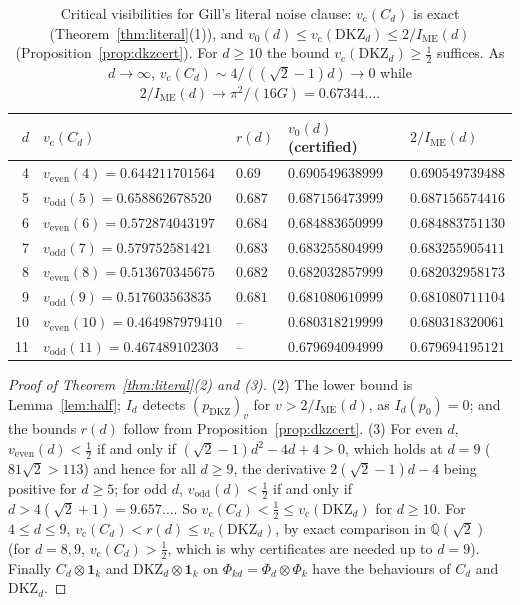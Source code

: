 \documentclass[11pt]{article}
\theoremstyle{remark}
\numberwithin{equation}{section}
\newcommand{\IME}{I_{\mathrm{ME}}}
\newcommand{\one}{\mathbf{1}}
\newcommand{\vc}{v_{\mathrm c}}
\newcommand{\veven}{v_{\mathrm{even}}}
\newcommand{\vodd}{v_{\mathrm{odd}}}
\newcommand{\DKZ}{\mathrm{DKZ}}
\begin{document}
\begin{table}[t]
\centering\small
\caption{Critical visibilities for Gill's literal noise clause: $\vc(C_d)$ is exact (Theorem~\ref{thm:literal}(1)), and
$v_0(d)\le\vc(\DKZ_d)\le2/\IME(d)$ (Proposition~\ref{prop:dkzcert}). For $d\ge10$ the bound $\vc(\DKZ_d)\ge\frac12$
suffices. As $d\to\infty$, $\vc(C_d)\sim4/((\sqrt2-1)d)\to0$ while $2/\IME(d)\to\pi^2/(16G)=0.67344\ldots$.}
\label{tab:thresholds}
\begin{tabular}{@{}rllll@{}}
\toprule
$d$ & $\vc(C_d)$ & $r(d)$ & $v_0(d)$ (certified) & $2/\IME(d)$\\
\midrule
4 & $\veven(4)=0.644211701564$ & $0.69$ & $0.690549638999$ & $0.690549739488$\\
5 & $\vodd(5)=0.658862678520$ & $0.687$ & $0.687156473999$ & $0.687156574416$\\
6 & $\veven(6)=0.572874043197$ & $0.684$ & $0.684883650999$ & $0.684883751130$\\
7 & $\vodd(7)=0.579752581421$ & $0.683$ & $0.683255804999$ & $0.683255905411$\\
8 & $\veven(8)=0.513670345675$ & $0.682$ & $0.682032857999$ & $0.682032958173$\\
9 & $\vodd(9)=0.517603563835$ & $0.681$ & $0.681080610999$ & $0.681080711104$\\
10 & $\veven(10)=0.464987979410$ & -- & $0.680318219999$ & $0.680318320061$\\
11 & $\vodd(11)=0.467489102303$ & -- & $0.679694094999$ & $0.679694195121$\\
\bottomrule
\end{tabular}
\end{table}

\begin{proof}[Proof of Theorem~\ref{thm:literal}\textup{(2)} and \textup{(3)}]
(2) The lower bound is Lemma~\ref{lem:half}; $I_d$ detects $(p_{\DKZ})_v$ for $v>2/\IME(d)$, as $I_d(p_0)=0$; and the
bounds $r(d)$ follow from Proposition~\ref{prop:dkzcert}. (3) For even $d$, $\veven(d)<\frac12$ if and only if
$(\sqrt2-1)d^2-4d+4>0$, which holds at $d=9$ ($81\sqrt2>113$) and hence for all $d\ge9$, the derivative
$2(\sqrt2-1)d-4$ being positive for $d\ge5$; for odd $d$, $\vodd(d)<\frac12$ if and only if $d>4(\sqrt2+1)=9.657\ldots$.
So $\vc(C_d)<\frac12\le\vc(\DKZ_d)$ for $d\ge10$. For $4\le d\le9$, $\vc(C_d)<r(d)\le\vc(\DKZ_d)$, by exact comparison in
$\mathbb Q(\sqrt2)$ (for $d=8,9$, $\vc(C_d)>\frac12$, which is why certificates are needed up to $d=9$). Finally
$C_d\otimes\one_k$ and $\DKZ_d\otimes\one_k$ on $\Phi_{kd}=\Phi_d\otimes\Phi_k$ have the behaviours of $C_d$ and
$\DKZ_d$.
\end{proof}
\end{document}
